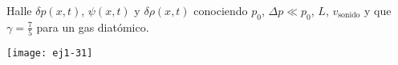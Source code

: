 \documentclass[11pt,spanish,a4paper]{article}
\begin{document}
\begin{enumerate}
\begin{minipage}[t][2cm]{0.65\textwidth}
Halle $\delta p(x,t)$, $\psi(x,t)$ y $\delta\rho(x,t)$ conociendo $p_0$, $\Delta p\ll p_0$, $L$, $v_\text{sonido}$ y que $\gamma= \frac{7}{5}$ para un gas diatómico.
\end{minipage}
\begin{minipage}[c][0.6cm][t]{0.3\textwidth}
	\texttt{[image: ej1-31]}
\end{minipage}





\end{enumerate}
\end{document}
